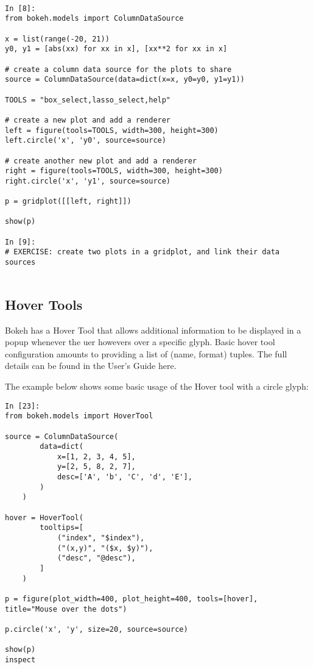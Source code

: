 \documentclass[a4paper,12pt]{article}
\begin{document}
\begin{framed}
	\begin{verbatim}
	
In [8]:
from bokeh.models import ColumnDataSource

x = list(range(-20, 21))
y0, y1 = [abs(xx) for xx in x], [xx**2 for xx in x]

# create a column data source for the plots to share
source = ColumnDataSource(data=dict(x=x, y0=y0, y1=y1))

TOOLS = "box_select,lasso_select,help"

# create a new plot and add a renderer
left = figure(tools=TOOLS, width=300, height=300)
left.circle('x', 'y0', source=source)

# create another new plot and add a renderer
right = figure(tools=TOOLS, width=300, height=300)
right.circle('x', 'y1', source=source)

p = gridplot([[left, right]])

show(p)
 
In [9]:
# EXERCISE: create two plots in a gridplot, and link their data sources
	
\end{verbatim}
\end{framed}

\newpage
\subsection{Hover Tools}
Bokeh has a Hover Tool that allows additional information to be displayed in a popup whenever the uer howevers over a specific glyph. Basic hover tool configuration amounts to providing a list of (name, format) tuples. The full details can be found in the User's Guide here.

The example below shows some basic usage of the Hover tool with a circle glyph:

\begin{framed}
\begin{verbatim}
In [23]:
from bokeh.models import HoverTool

source = ColumnDataSource(
        data=dict(
            x=[1, 2, 3, 4, 5],
            y=[2, 5, 8, 2, 7],
            desc=['A', 'b', 'C', 'd', 'E'],
        )
    )

hover = HoverTool(
        tooltips=[
            ("index", "$index"),
            ("(x,y)", "($x, $y)"),
            ("desc", "@desc"),
        ]
    )

p = figure(plot_width=400, plot_height=400, tools=[hover], title="Mouse over the dots")

p.circle('x', 'y', size=20, source=source)

show(p)
inspect 	
\end{verbatim}
\end{framed}
\end{document}
